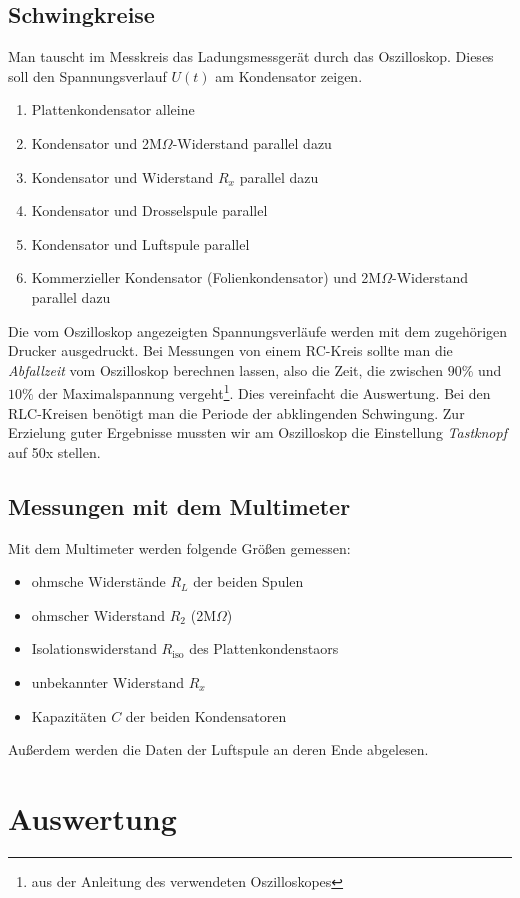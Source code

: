 \documentclass[12pt,a4paper,titlepage,headinclude,bibtotoc]{scrartcl}
\begin{document}
\subsection{Schwingkreise}
Man tauscht im Messkreis das Ladungsmessgerät durch das Oszilloskop.
Dieses soll den Spannungsverlauf $U(t)$ am Kondensator zeigen.
\begin{enumerate}
	\item Plattenkondensator alleine
	\item Kondensator und 2M$\Omega$-Widerstand parallel dazu
	\item Kondensator und Widerstand $R_x$ parallel dazu
	\item Kondensator und Drosselspule parallel
	\item Kondensator und Luftspule parallel
	\item Kommerzieller Kondensator (Folienkondensator) und 2M$\Omega$-Widerstand parallel dazu	
\end{enumerate}
Die vom Oszilloskop angezeigten Spannungsverläufe werden mit dem zugehörigen Drucker ausgedruckt.
Bei Messungen von einem RC-Kreis sollte man die \emph{Abfallzeit} vom Oszilloskop berechnen lassen, also die Zeit, die zwischen $90\%$ und $10\%$ der Maximalspannung vergeht\footnote{aus der Anleitung des verwendeten Oszilloskopes}.%
Dies vereinfacht die Auswertung.
Bei den RLC-Kreisen benötigt man die Periode der abklingenden Schwingung. 
Zur Erzielung guter Ergebnisse mussten wir am Oszilloskop die Einstellung \emph{Tastknopf} auf 50x stellen.

\subsection{Messungen mit dem Multimeter}
Mit dem Multimeter werden folgende Größen gemessen:
\begin{itemize}
	\item ohmsche Widerstände $R_L$ der beiden Spulen
	\item ohmscher Widerstand $R_2$ (2M$\Omega$)
	\item Isolationswiderstand $R_\text{iso}$ des Plattenkondenstaors
	\item unbekannter Widerstand $R_x$
 	\item Kapazitäten $C$ der beiden Kondensatoren  
\end{itemize}
Außerdem werden die Daten der Luftspule an deren Ende abgelesen.

\section{Auswertung}
\label{sec:auswertung}
\end{document}
